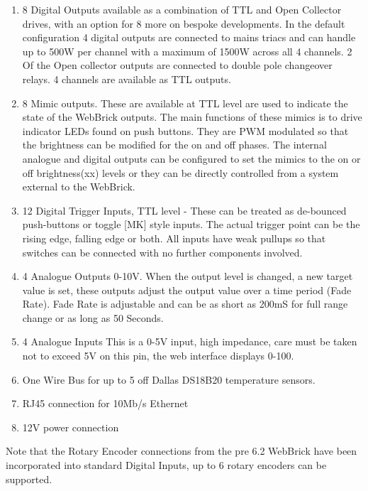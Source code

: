 \begin{enumerate}

\item
8 Digital Outputs available as a combination of TTL and Open Collector drives, with an option for 8 more on bespoke 
developments. 
In the default configuration 4 digital outputs are connected to mains triacs and can handle up to 500W 
per channel with a maximum of 1500W across all 4 channels. 2 Of the Open collector outputs are connected to double pole 
changeover relays. 4 channels are available as TTL outputs.

\item
8 Mimic outputs.  These are available at TTL level are used to indicate the state of the WebBrick outputs.
The main functions of these mimics is to drive indicator LEDs found on push buttons. They are PWM modulated so that the
brightness can be modified for the on and off phases. The internal analogue and digital outputs can be configured to set 
the mimics to the on or off brightness(xx) levels or they can be directly controlled from a system external to the WebBrick.

\item
12 Digital Trigger Inputs, TTL level - These can be treated as de-bounced push-buttons or toggle [MK] style inputs.  
The actual trigger point can be the rising edge, falling edge or both. All inputs have weak pullups so that 
switches can be connected with no further components involved.

\item
4 Analogue Outputs 0-10V. When the output level is changed, a new target value is set, these outputs 
adjust the output value over a time period (Fade Rate). Fade Rate is adjustable and can be as short as 200mS for full range 
change or as long as 50 Seconds.

\item
4 Analogue Inputs This is a 0-5V input, high impedance, care must be taken not to exceed 5V on this pin, 
the web interface displays 0-100.

\item
One Wire Bus for up to 5 off Dallas DS18B20 temperature sensors.

\item
RJ45 connection for 10Mb/s Ethernet

\item
12V power connection

\end{enumerate}

Note that the Rotary Encoder connections from the pre 6.2 WebBrick have been incorporated into standard Digital Inputs, up to
6 rotary encoders can be supported.
